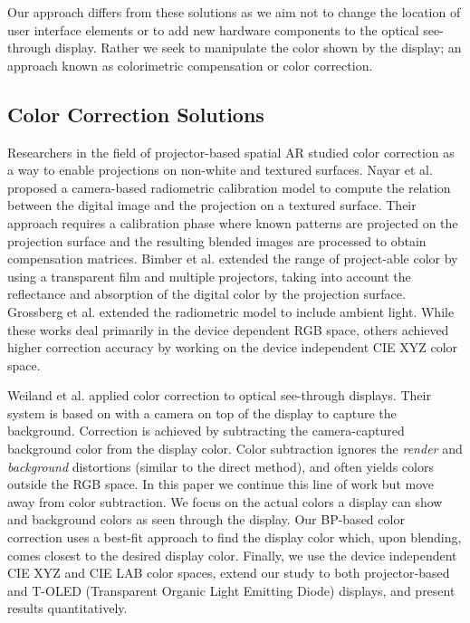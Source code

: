\documentclass[annual]{acmsiggraph}
\begin{document}
Our approach differs from these solutions as we aim not to change the location of user interface elements or to add new hardware components to the optical see-through display. Rather we seek to manipulate the color shown by the display; an approach known as colorimetric compensation or color correction.

\subsection{Color Correction Solutions}
Researchers in the field of projector-based spatial AR studied color correction as a way to enable projections on non-white and textured surfaces. Nayar et al. proposed a camera-based radiometric calibration model to compute the relation between the digital image and the projection on a textured surface. Their approach requires a calibration phase where known patterns are projected on the projection surface and the resulting blended images are processed to obtain compensation matrices. Bimber et al.  extended the range of project-able color by using a transparent film and multiple projectors, taking into account the reflectance and absorption of the digital color by the projection surface. Grossberg et al.  extended the radiometric model to include ambient light. While these works deal primarily in the device dependent RGB space, others achieved higher correction accuracy by working on the device independent CIE XYZ color space\cite{Ashdown:2006:DSI}\cite{Menk:2011}.

Weiland et al.  applied color correction to optical see-through displays. Their system is based on \cite{Bimber:2005} with a camera on top of the display to capture the background. Correction is achieved by subtracting the camera-captured background color from the display color. Color subtraction ignores the \textit{render} and \textit{background} distortions (similar to the direct method), and often yields colors outside the RGB space. In this paper we continue this line of work but move away from color subtraction. We focus on the actual colors a display can show and background colors as seen through the display. Our BP-based color correction uses a best-fit approach to find the display color which, upon blending, comes closest to the desired display color. Finally, we use the device independent CIE XYZ and CIE LAB color spaces, extend our study to both projector-based and T-OLED (Transparent Organic Light Emitting Diode) displays, and present results quantitatively.
\end{document}
